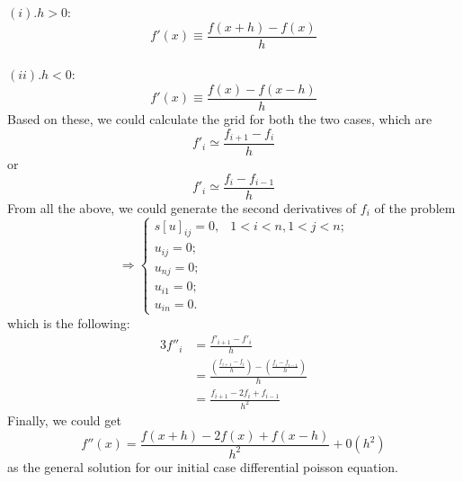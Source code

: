 \documentclass [a4paper, 12pt]{article}
\begin{document}
$(i). h>0:$ \\
\begin {equation}
      f'(x) \equiv \frac {f(x+h)-f(x)}
                                  {h}
\end {equation} \\
$(ii). h<0:$ \\
\begin {equation}
      f'(x) \equiv \frac {f(x)-f(x-h)}
                                  {h}
\end {equation}
Based on these, we could calculate the grid for both the two cases, which are \\
\begin {equation}
      f'_i \simeq \frac {f_{i+1}-f_i}
                                 {h}
\end {equation}
or \\
\begin {equation}
      f'_i \simeq \frac {f_i-f_{i-1}}
                                 {h}
\end {equation}
From all the above, we could generate the second derivatives of $f_i$ of the problem \\
\begin {equation}
      \Longrightarrow
      \begin {cases}
s[u]_{ij}=0, &\text{$1<i<n, 1<j<n$;} \\
u_{ij}=0; \\
u_{nj}=0; \\
u_{i1}=0; \\
u_{in}=0.
      \end {cases}
\end {equation}
which is the following: \\
\begin {alignat}{3} \label {E:mm4}
f''_i &= \frac {f'_{i+1}-f'_i}
                     {h} \\
       &=\frac {(\frac{f_{i+1}-f_i}
                     {h})-(\frac{f_i-f_{i-1}}
                                      {h})}
                     {h} \\
       &=\frac {f_{i+1}-2f_i+f_{i-1}}
                     {h^2}
\end {alignat}
Finally, we could get \\
\begin {equation}
      f''(x)=\frac {f(x+h)-2f(x)+f(x-h)}
                         {h^2}
              +
                0(h^2)
\end {equation}
as the general solution for our initial case differential poisson equation.
\end{document}
